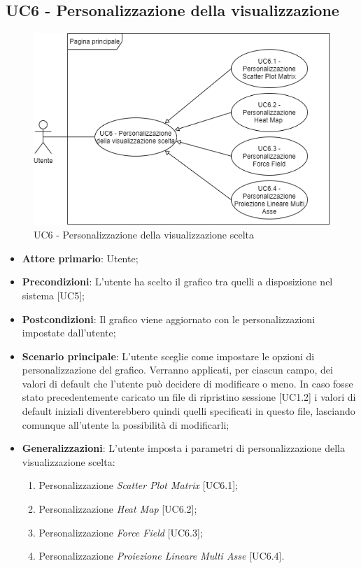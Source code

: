 \subsection{UC6 - Personalizzazione della visualizzazione}
\begin{figure}[h]
\includegraphics[width=\linewidth]{Section/Images/UC6.png}
\centering
\caption{UC6 - Personalizzazione della visualizzazione scelta}
\end{figure}
\begin{itemize}
	\item \textbf{Attore primario}: Utente;
	
	\item \textbf{Precondizioni}: L'utente ha scelto il grafico tra quelli a disposizione nel sistema [UC5];
	
	\item \textbf{Postcondizioni}: Il grafico viene aggiornato con le personalizzazioni impostate dall'utente;
	
	\item \textbf{Scenario principale}: L’utente sceglie come impostare le opzioni di personalizzazione del grafico. Verranno applicati, per ciascun campo, dei valori di default che l'utente può decidere di modificare o meno. In caso fosse stato precedentemente caricato un file di ripristino sessione [UC1.2] i valori di default iniziali diventerebbero quindi quelli specificati in questo file, lasciando comunque all'utente la possibilità di modificarli;
	
	\item \textbf{Generalizzazioni}: L'utente imposta i parametri di personalizzazione della visualizzazione scelta:
	\begin{enumerate}
	\item Personalizzazione \textit{Scatter Plot Matrix} [UC6.1];
	\item Personalizzazione \textit{Heat Map} [UC6.2];
	\item Personalizzazione \textit{Force Field} [UC6.3];
	\item Personalizzazione \textit{Proiezione Lineare Multi Asse} [UC6.4].
	\end{enumerate}
		
\end{itemize}



